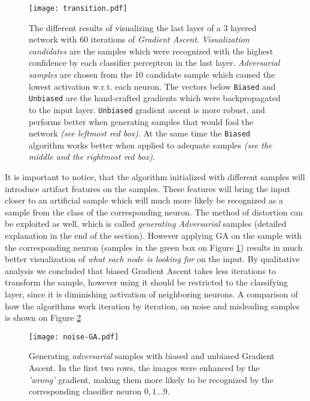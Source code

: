 \begin{figure}
    \centering
    \texttt{[image: transition.pdf]}
    \caption{
        The different results of visualizing the last layer of a 3 layered network with 60 iterations of \emph{Gradient Ascent}. 
        \emph{Visualization candidates} are the samples which were recognized with the highest confidence by each classifier perceptron in the last layer.
        \emph{Adversarial samples} are chosen from the 10 candidate sample which caused the lowest activation w.r.t. each neuron.
        The vectors below \texttt{Biased} and \texttt{Unbiased} are the hand-crafted gradients which were backpropagated to the input layer.
        \texttt{Unbiased} gradient ascent is more robust, and performs better when generating samples that would fool the network \emph{(see leftmost red box)}.
        At the same time the \texttt{Biased} algorithm works better when applied to adequate samples \emph{(see the middle and the rightmost red box)}.
    }
    \label{fig:bias-nobias}
\end{figure}
It is important to notice, that the algorithm initialized with different samples will introduce artifact features on the samples. 
These features will bring the input closer to an artificial sample which will much more likely be recognized as a sample from the class of the corresponding neuron. 
The method of distortion can be exploited as well, which is called \emph{generating Adversarial} samples (detailed explanation in the end of the section).
However applying GA on the sample with the corresponding neuron (samples in the green box on Figure \ref{fig:bias-nobias}) results in much better visualization of \emph{what each node is looking for} on the input.
By qualitative analysis we concluded that biased Gradient Ascent takes less iterations to transform the sample, 
however using it should be restricted to the classifying layer, since it is diminishing activation of neighboring neurons. 
A comparison of how the algorithms work iteration by iteration, on noise and misleading samples is shown on Figure \ref{fig:noise-GA}
    

\begin{figure}
    \centering
    \texttt{[image: noise-GA.pdf]}
    \caption{Generating \emph{adversarial} samples with biased and unbiased Gradient Ascent. 
    In the first two rows, the images were enhanced by the \emph{'wrong'} gradient, making them more likely to be recognized by the corresponding classifier neuron
    $0, 1 ... 9$.
    }
    \label{fig:noise-GA}
\end{figure}


